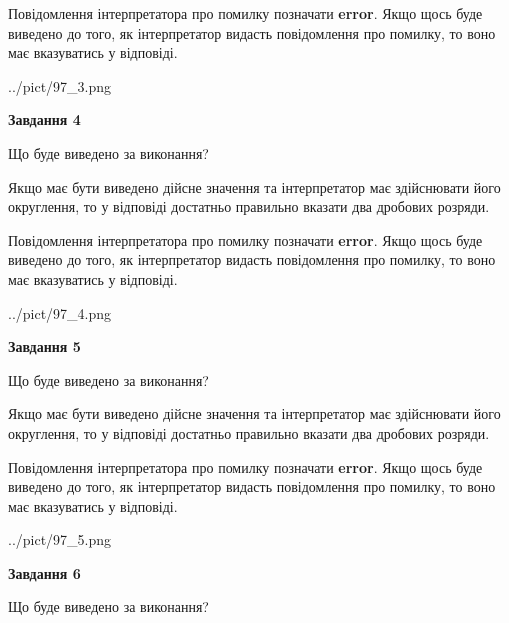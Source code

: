 \documentclass[12pt, ukrainian]{article}
\begin{document}
{\begin {Large}
Повідомлення інтерпретатора про помилку позначати \textbf{error}.
Якщо щось буде виведено до того, як інтерпретатор видасть повідомлення про помилку, 
то воно має вказуватись у відповіді. \par

\begin{center}
	{../pict/97_3.png}
\end{center}
\newpage

{\begin {center}\textbf{Завдання 4}\end {center}}\par
Що буде виведено за виконання? \par

Якщо має бути виведено дійсне значення та інтерпретатор має здійснювати його округлення, 
то у відповіді достатньо правильно вказати два дробових розряди.

Повідомлення інтерпретатора про помилку позначати \textbf{error}.
Якщо щось буде виведено до того, як інтерпретатор видасть повідомлення про помилку, 
то воно має вказуватись у відповіді. \par

\begin{center}
	{../pict/97_4.png}
\end{center}
\newpage

{\begin {center}\textbf{Завдання 5}\end {center}}\par
Що буде виведено за виконання? \par

Якщо має бути виведено дійсне значення та інтерпретатор має здійснювати його округлення, 
то у відповіді достатньо правильно вказати два дробових розряди.

Повідомлення інтерпретатора про помилку позначати \textbf{error}.
Якщо щось буде виведено до того, як інтерпретатор видасть повідомлення про помилку, 
то воно має вказуватись у відповіді. \par

\begin{center}
	{../pict/97_5.png}
\end{center}
\newpage

{\begin {center}\textbf{Завдання 6}\end {center}}\par
Що буде виведено за виконання? \par


\end{Large}}
\end{document}
